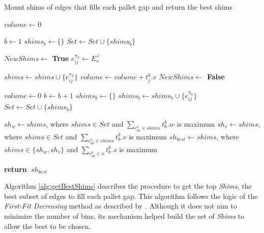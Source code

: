 \documentclass[preprint,authoryear]{elsarticle}
\renewcommand{\Return}{\State \bf {return}~}
\begin{document}
\begin{algorithm}[H]
	\caption{Mount shims of edges that fills each pallet gap and return the best shims}  \label{alg:getBestShims}
	\begin{algorithmic}[1]
		
		
		\State $volume \gets 0$	
		
		\State $b \gets 1$
		\State $shims_b \gets \{\}$  \label{empty_shims}
		\State $Set \gets Set \cup \{shims_b\}$ \label{empty_set}
		
		 \label{edges_indexes}
		
		
		\State $NewShims \gets$ {\bf True} \label{new_shims}
		\State $e_{ij}^{\pi_k} \gets E_x^{\ i}$
		
		 \label{shims_set}
		
		
		
		\State $shims \gets shims \cup \{e_{ij}^{\pi_k}\}$
		\State $volume \gets volume + t_j^k.v$
		\State $NewShims \gets$ {\bf False} \label{new_shims_false}
		
		
		\EndIf
		
		\EndFor 
		
		 \label{new_shims2}
		\State $volume \gets 0$
		\State $b \gets b + 1$
		\State $shims_b \gets \{\}$
		\State $shims_b \gets shims_b \cup \{e_{ij}^{\pi_k}\}$
		\State $Set \gets Set \cup \{shims_b\}$
		\EndIf
		
		\EndFor 
		
		\State $sh_w \gets shims$, where $shims \in Set$ and $\sum_{e_{ab}^k \in shims} t_b^k.w$ is maximum  \label{best_weight}		
		\State $sh_v \gets shims$, where $shims \in Set$ and $\sum_{e_{ab}^k \in shims} t_b^k.v$ is maximum \label{best_volume}
		\State $sh_{best} \gets shims$, where $shims \in \{sh_w, sh_v\}$ and $\sum_{e_{ab}^k \in x} t_b^k.s$ is maximum \label{best_score}
		
		\Return $sh_{best}$
		
		\EndProcedure
		
	\end{algorithmic}
\end{algorithm}

Algorithm \ref{alg:getBestShims} describes the procedure to get the top {\it Shims}, the best subset of edges to fill each pallet gap. This algorithm follows the logic of the {\it First-Fit Decreasing} method as described by \cite{JohnsonGarey1985}. Although it does not aim to minimize the number of bins, its mechanism helped build the set of {\it Shims} to allow the best to be chosen.
\end{document}
